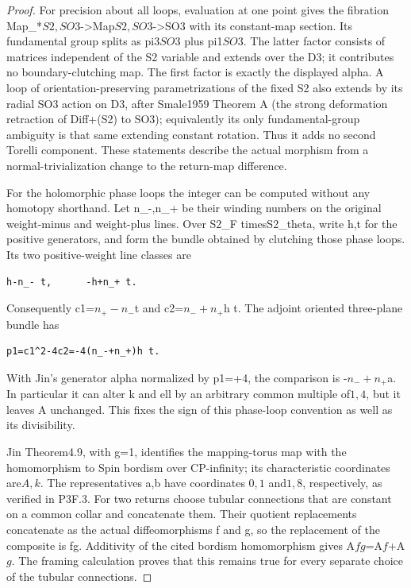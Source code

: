 \begin{proof}
For precision about all loops, evaluation at one point gives the fibration Map\_*\(S2,SO3\)-\textgreater Map\(S2,SO3\)-\textgreater SO3 with its constant-map section. Its fundamental group splits as pi3\(SO3\) plus pi1\(SO3\). The latter factor consists of matrices independent of the S2 variable and extends over the D3; it contributes no boundary-clutching map. The first factor is exactly the displayed alpha. A loop of orientation-preserving parametrizations of the fixed S2 also extends by its radial SO3 action on D3, after Smale1959 Theorem A (the strong deformation retraction of Diff+(S2) to SO3); equivalently its only fundamental-group ambiguity is that same extending constant rotation. Thus it adds no second Torelli component. These statements describe the actual morphism from a normal-trivialization change to the return-map difference.

For the holomorphic phase loops the integer can be computed without any homotopy shorthand. Let n\_-,n\_+ be their winding numbers on the original weight-minus and weight-plus lines. Over S2\_F timesS2\_theta, write h,t for the positive generators, and form the bundle obtained by clutching those phase loops. Its two positive-weight line classes are

\begin{lstlisting}
h-n_- t,      -h+n_+ t.
\end{lstlisting}

Consequently c1=\(n_+-n_-\)t and c2=\(n_-+n_+\)h t. The adjoint oriented three-plane bundle has

\begin{lstlisting}
p1=c1^2-4c2=-4(n_-+n_+)h t.
\end{lstlisting}

With Jin's generator alpha normalized by p1=+4, the comparison is -\(n_-+n_+\)a. In particular it can alter k and ell by an arbitrary common multiple of\(1,4\), but it leaves A unchanged. This fixes the sign of this phase-loop convention as well as its divisibility.

Jin Theorem4.9, with g=1, identifies the mapping-torus map with the homomorphism to Spin bordism over CP-infinity; its characteristic coordinates are\(A,k\). The representatives a,b have coordinates \(0,1\) and\(1,8\), respectively, as verified in P3F.3. For two returns choose tubular connections that are constant on a common collar and concatenate them. Their quotient replacements concatenate as the actual diffeomorphisms f and g, so the replacement of the composite is fg. Additivity of the cited bordism homomorphism gives A\(fg\)=A\(f\)+A\(g\). The framing calculation proves that this remains true for every separate choice of the tubular connections.


\end{proof}
